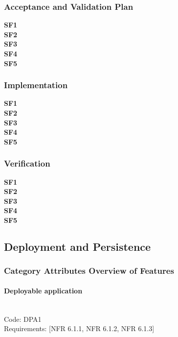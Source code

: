 \documentclass{article}
\begin{document}
\subsubsection{Acceptance and Validation Plan}
\textbf{SF1} \mbox{} \\
\textbf{SF2} \mbox{} \\
\textbf{SF3} \mbox{} \\
\textbf{SF4} \mbox{} \\
\textbf{SF5} \mbox{} \\

\subsubsection{Implementation}
\textbf{SF1} \mbox{} \\
\textbf{SF2} \mbox{} \\
\textbf{SF3} \mbox{} \\
\textbf{SF4} \mbox{} \\
\textbf{SF5} \mbox{} \\

\subsubsection{Verification}
\textbf{SF1} \mbox{} \\
\textbf{SF2} \mbox{} \\
\textbf{SF3} \mbox{} \\
\textbf{SF4} \mbox{} \\
\textbf{SF5} \mbox{} \\







\subsection{Deployment and Persistence}
\subsubsection{Category Attributes Overview of Features}
\paragraph{Deployable application} \mbox{} \\
\noindent Code: DPA1 \\
\noindent Requirements: [NFR 6.1.1, NFR 6.1.2, NFR 6.1.3] 
\end{document}
